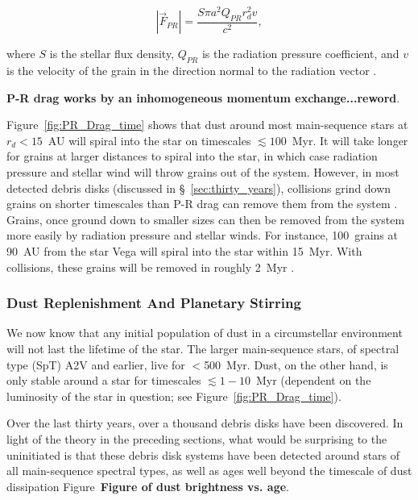     
    \begin{equation}\label{eq:pr_drag}
    |\vec{F}_{PR}| = \frac{S\pi a^2 Q_{PR}r_d^2 v}{c^2},
    \end{equation}
    
    \noindent where $S$ is the stellar flux density, $Q_{PR}$ is the radiation pressure coefficient, and $v$ is the velocity of the grain in the direction normal to the radiation vector \citep[i.e., orbital direction;][]{Burns1979}. 
    
    \textbf{P-R drag works by an inhomogeneous momentum exchange...reword}.
    
    Figure~\ref{fig:PR_Drag_time} shows that dust around most main-sequence stars at $r_d<15$~AU will spiral into the star on timescales $\lesssim 100$~Myr. It will take longer for grains at larger distances to spiral into the star, in which case radiation pressure and stellar wind will throw grains out of the system. However, in most detected debris disks (discussed in \S~\ref{sec:thirty_years}), collisions grind down grains on shorter timescales than P-R drag can remove them from the system \citep[e.g.,][]{Wyatt2008}. Grains, once ground down to smaller sizes can then be removed from the system more easily by radiation pressure and stellar winds. For instance, 100\micron\  grains at 90~AU from the star Vega will spiral into the star within 15~Myr. With collisions, these grains will be removed in roughly 2~Myr \citep{Backman1993}. 
    
    \subsubsection{Dust Replenishment And Planetary Stirring}\label{sec:replenishment}
    
    We now know that any initial population of dust in a circumstellar environment will not last the lifetime of the star. The larger main-sequence stars, of spectral type (SpT) A2V and earlier, live for $<$500~Myr. Dust, on the other hand, is only stable around a star for timescales $\lesssim 1-10$~Myr (dependent on the luminosity of the star in question; see Figure~\ref{fig:PR_Drag_time}). 
    
    Over the last thirty years, over a thousand debris disks have been discovered. In light of the theory in the preceding sections, what would be surprising to the uninitiated is that these debris disk systems have been detected around stars of all main-sequence spectral types, as well as ages well beyond the timescale of dust dissipation Figure~\textbf{Figure of dust brightness vs. age}. 
    
